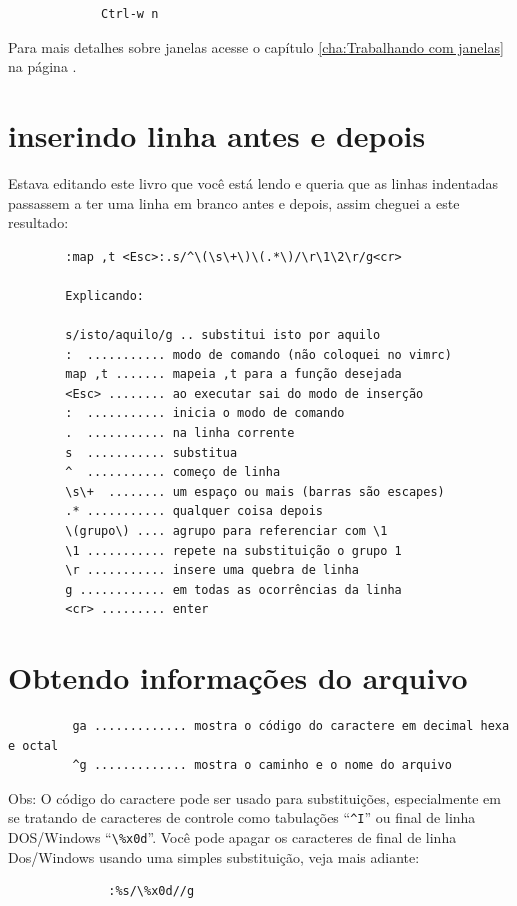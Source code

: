 \documentclass[10pt,a4paper,openany]{book}
\begin{document}
\begin{verbatim}
			 Ctrl-w n
\end{verbatim}

Para mais detalhes sobre janelas acesse o capítulo
\ref{cha:Trabalhando com janelas} na página \pageref{cha:Trabalhando
com janelas}.


\section{inserindo linha antes e depois}
Estava editando este livro que você está lendo
e queria que as linhas indentadas passassem a ter
uma linha em branco antes e depois, assim cheguei
a este resultado:
\begin{verbatim}
		:map ,t <Esc>:.s/^\(\s\+\)\(.*\)/\r\1\2\r/g<cr>

		Explicando:

		s/isto/aquilo/g .. substitui isto por aquilo
		:  ........... modo de comando (não coloquei no vimrc)
		map ,t ....... mapeia ,t para a função desejada
		<Esc> ........ ao executar sai do modo de inserção
		:  ........... inicia o modo de comando
		.  ........... na linha corrente
		s  ........... substitua
		^  ........... começo de linha
		\s\+  ........ um espaço ou mais (barras são escapes)
		.* ........... qualquer coisa depois
		\(grupo\) .... agrupo para referenciar com \1
		\1 ........... repete na substituição o grupo 1
		\r ........... insere uma quebra de linha
		g ............ em todas as ocorrências da linha
		<cr> ......... enter
\end{verbatim}

\section{Obtendo informações do arquivo }

\begin{verbatim}
		 ga ............. mostra o código do caractere em decimal hexa e octal
		 ^g ............. mostra o caminho e o nome do arquivo
\end{verbatim}

Obs: O código do caractere pode ser usado para substituições,
especialmente em se tratando de caracteres de controle como tabulações
``\verb|^I|'' ou final de linha DOS/Windows ``\verb|\%x0d|''. Você pode apagar os
caracteres de final de linha Dos/Windows usando uma simples
substituição, veja mais adiante:

\begin{verbatim}
			  :%s/\%x0d//g
\end{verbatim}
\end{document}
